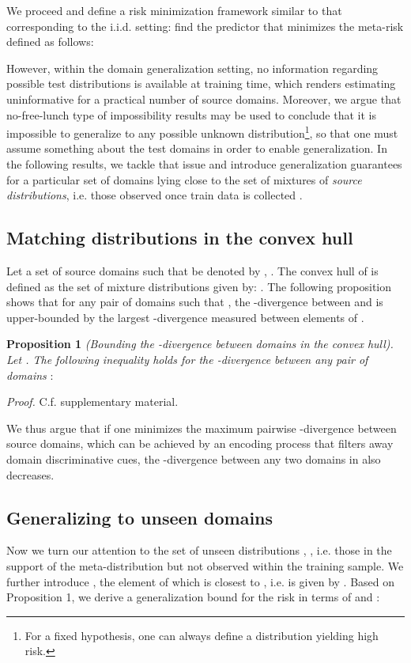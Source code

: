 \documentclass{article}
\begin{document}
\noindent We proceed and define a risk minimization framework similar to that corresponding to the i.i.d. setting: find the predictor  that minimizes the meta-risk  defined as follows: 

However, within the domain generalization setting, no information regarding possible test distributions is available at training time, which renders estimating  uninformative for a practical number of source domains. Moreover, we argue that no-free-lunch type of impossibility results may be used to conclude that it is impossible to generalize to any possible unknown distribution\footnote{For a fixed hypothesis, one can always define a distribution yielding high risk.}, so that one must assume something about the test domains in order to enable generalization. In the following results, we tackle that issue and introduce generalization guarantees for a particular set of domains lying close to the set of mixtures of \emph{source distributions}, i.e. those observed once train data is collected
\cite{hoffman2018algorithms}.

\subsection{Matching distributions in the convex hull}
Let a set  of source domains such that  be denoted by , . The convex hull  of  is defined as the set of mixture distributions given by: .  
The following proposition shows that for any pair of domains such that , the -divergence between  and  is upper-bounded by the largest -divergence measured between elements of .

\textbf{Proposition 1} \textit{(Bounding the -divergence between domains in the convex hull). Let . The following inequality holds for the -divergence between any pair of domains }:

\textit{Proof.} C.f. supplementary material. 

We thus argue that if one minimizes the maximum pairwise -divergence between source domains, which can be achieved by an encoding process that filters away domain discriminative cues, the -divergence between any two domains in  also decreases. 

\subsection{Generalizing to unseen domains}
Now we turn our attention to the set of unseen distributions , , i.e. those in the support of the meta-distribution but not observed within the training sample. We further introduce , the element of  which is closest to , i.e.   is given by . Based on Proposition 1, we derive a generalization bound for the risk  in terms of  and :
\end{document}
